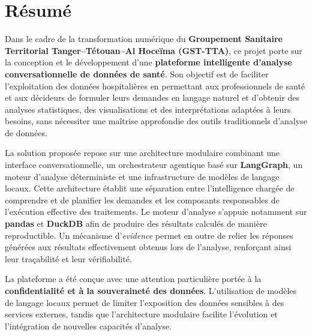 \chapter*{Résumé}

Dans le cadre de la transformation numérique du \textbf{Groupement Sanitaire Territorial Tanger--Tétouan--Al Hoceïma (GST-TTA)}, ce projet porte sur la conception et le développement d'une \textbf{plateforme intelligente d'analyse conversationnelle de données de santé}. Son objectif est de faciliter l'exploitation des données hospitalières en permettant aux professionnels de santé et aux décideurs de formuler leurs demandes en langage naturel et d'obtenir des analyses statistiques, des visualisations et des interprétations adaptées à leurs besoins, sans nécessiter une maîtrise approfondie des outils traditionnels d'analyse de données.

La solution proposée repose sur une architecture modulaire combinant une interface conversationnelle, un orchestrateur agentique basé sur \textbf{LangGraph}, un moteur d'analyse déterministe et une infrastructure de modèles de langage locaux. Cette architecture établit une séparation entre l'intelligence chargée de comprendre et de planifier les demandes et les composants responsables de l'exécution effective des traitements. Le moteur d'analyse s'appuie notamment sur \textbf{pandas} et \textbf{DuckDB} afin de produire des résultats calculés de manière reproductible. Un mécanisme d'\textit{evidence} permet en outre de relier les réponses générées aux résultats effectivement obtenus lors de l'analyse, renforçant ainsi leur traçabilité et leur vérifiabilité.

La plateforme a été conçue avec une attention particulière portée à la \textbf{confidentialité et à la souveraineté des données}. L'utilisation de modèles de langage locaux permet de limiter l'exposition des données sensibles à des services externes, tandis que l'architecture modulaire facilite l'évolution et l'intégration de nouvelles capacités d'analyse.

